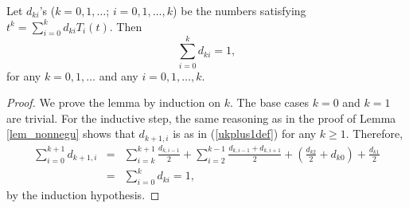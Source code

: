 \documentclass[12pt]{article}
\begin{document}
\begin{lemma}
\label{lem_sumeq1}
Let $d_{ki}$'s ($k = 0,1,\ldots$; $i =
0,1,\ldots, k$) be the numbers satisfying $t^k = \sum_{i=0}^k
d_{ki}T_i(t)$. Then
\[
\sum_{i=0}^kd_{ki} = 1,
\]
for any $k = 0,1,\ldots$ and any $i = 0,1,\ldots, k$.
\begin{proof}
We prove the lemma by induction on $k$.  The base cases $k=0$ and
$k=1$ are trivial.  For the inductive step, the same reasoning as
in the proof of Lemma \ref{lem_nonnegu} shows that $d_{k+1,i}$ is
as in (\ref{ukplus1def}) for any $k \geq 1$.  Therefore,
\begin{eqnarray}
\sum_{i=0}^{k+1}d_{k+1,i} & = &
\sum_{i=k}^{k+1}\frac{d_{k,i-1}}{2} + \sum_{i=2}^{k-1}
\frac{d_{k,i-1}+d_{k,i+1}}{2} +
\left(\frac{d_{k2}}{2}+d_{k0}\right) + \frac{d_{k1}}{2} \nonumber
\\
& = & \sum_{i=0}^k d_{ki} = 1, \nonumber
\end{eqnarray}
by the induction hypothesis.
\end{proof}
\end{lemma}
\end{document}
